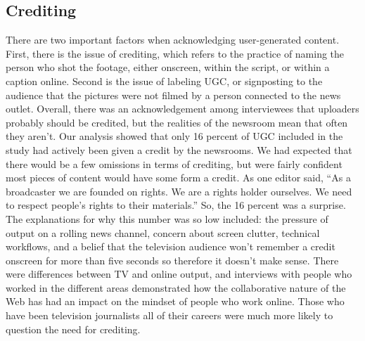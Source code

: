 \begin{enumerate}
\chapter{Crediting}
There are two important factors when acknowledging user-generated content.
First, there is the issue of crediting, which refers to the practice of
naming the person who shot the footage, either onscreen, within the script,
or within a caption online. Second is the issue of labeling UGC, or signposting
to the audience that the pictures were not filmed by a person connected
to the news outlet.
Overall, there was an acknowledgement among interviewees that uploaders
probably should be credited, but the realities of the newsroom mean
that often they aren't. Our analysis showed that only 16 percent of UGC
included in the study had actively been given a credit by the newsrooms.
We had expected that there would be a few omissions in terms of crediting,
but were fairly confident most pieces of content would have some form a
credit. As one editor said, ``As a broadcaster we are founded on rights. We
are a rights holder ourselves. We need to respect people's rights to their
materials.'' So, the 16 percent was a surprise.
The explanations for why this number was so low included: the pressure of
output on a rolling news channel, concern about screen clutter, technical
workflows, and a belief that the television audience won't remember a credit
onscreen for more than five seconds so therefore it doesn't make sense.
There were differences between TV and online output, and interviews with
people who worked in the different areas demonstrated how the collaborative
nature of the Web has had an impact on the mindset of people who
work online. Those who have been television journalists all of their careers
were much more likely to question the need for crediting.


\end{enumerate}
